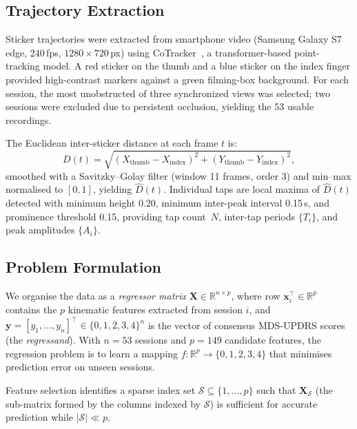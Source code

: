\documentclass[conference]{IEEEtran}
\begin{document}
\subsection{Trajectory Extraction}

Sticker trajectories were extracted from smartphone video (Samsung Galaxy S7 edge,
240\,fps, $1280 \times 720$\,px) using CoTracker~\cite{karaev2023cotracker}, a
transformer-based point-tracking model.
A red sticker on the thumb and a blue sticker on the index finger provided
high-contrast markers against a green filming-box background.
For each session, the most unobstructed of three synchronized views was selected;
two sessions were excluded due to persistent occlusion, yielding the 53 usable
recordings.

The Euclidean inter-sticker distance at each frame $t$ is:
\begin{equation}
    D(t) = \sqrt{(X_{\mathrm{thumb}} - X_{\mathrm{index}})^{2}
                 + (Y_{\mathrm{thumb}} - Y_{\mathrm{index}})^{2}},
    \label{eq:distance}
\end{equation}
smoothed with a Savitzky--Golay filter (window 11 frames, order 3) and min--max
normalised to $[0,1]$, yielding $\hat{D}(t)$.
Individual taps are local maxima of $\hat{D}(t)$ detected with minimum height 0.20,
minimum inter-peak interval 0.15\,s, and prominence threshold 0.15,
providing tap count~$N$, inter-tap periods $\{T_i\}$, and peak amplitudes $\{A_i\}$.

\subsection{Problem Formulation}

We organise the data as a \emph{regressor matrix} $\mathbf{X} \in \mathbb{R}^{n \times p}$,
where row $\mathbf{x}_i^{\top} \in \mathbb{R}^p$ contains the $p$ kinematic features
extracted from session $i$, and $\mathbf{y} = [y_1, \ldots, y_n]^{\top} \in \{0,1,2,3,4\}^n$
is the vector of consensus MDS-UPDRS scores (the \emph{regressand}).
With $n = 53$ sessions and $p = 149$ candidate features, the regression problem is to
learn a mapping $f: \mathbb{R}^{p} \to \{0,1,2,3,4\}$ that minimises prediction error
on unseen sessions.

Feature selection identifies a sparse index set $\mathcal{S} \subseteq \{1,\ldots,p\}$
such that $\mathbf{X}_{\mathcal{S}}$ (the sub-matrix formed by the columns indexed by
$\mathcal{S}$) is sufficient for accurate prediction while $|\mathcal{S}| \ll p$.
\end{document}
